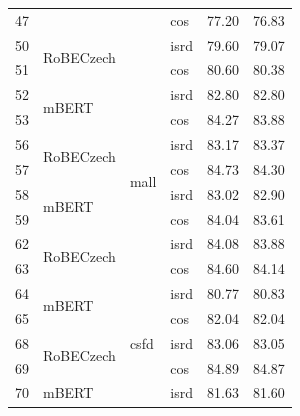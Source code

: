 \begin{table}[]
{\begin{tabular}{|l|l|l|l||ll|}
47 &                            &                           & cos                   & 77.20   & 76.83 \\ \cline{1-2} \cline{4-6}
50 & \multirow{2}{*}{RoBECzech} &                           & isrd                  & 79.60   & 79.07 \\ \cline{1-1} \cline{4-6}
51 &                            &                           & cos                   & 80.60   & 80.38 \\ \hline
52 & \multirow{2}{*}{mBERT}     & \multirow{8}{*}{mall}     & isrd                  & 82.80   & 82.80 \\ \cline{1-1} \cline{4-6}
53 &                            &                           & cos                   & 84.27   & 83.88 \\ \cline{1-2} \cline{4-6}
56 & \multirow{2}{*}{RoBECzech} &                           & isrd                  & 83.17   & 83.37 \\ \cline{1-1} \cline{4-6}
57 &                            &                           & cos                   & 84.73   & 84.30 \\ \cline{1-2} \cline{4-6}
58 & \multirow{2}{*}{mBERT}     &                           & isrd                  & 83.02   & 82.90 \\ \cline{1-1} \cline{4-6}
59 &                            &                           & cos                   & 84.04   & 83.61 \\ \cline{1-2} \cline{4-6}
62 & \multirow{2}{*}{RoBECzech} &                           & isrd                  & 84.08   & 83.88 \\ \cline{1-1} \cline{4-6}
63 &                            &                           & cos                   & 84.60   & 84.14 \\ \hline
64 & \multirow{2}{*}{mBERT}     & \multirow{8}{*}{csfd}     & isrd                  & 80.77   & 80.83 \\ \cline{1-1} \cline{4-6}
65 &                            &                           & cos                   & 82.04   & 82.04 \\ \cline{1-2} \cline{4-6}
68 & \multirow{2}{*}{RoBECzech} &                           & isrd                  & 83.06   & 83.05 \\ \cline{1-1} \cline{4-6}
69 &                            &                           & cos                   & 84.89   & 84.87 \\ \cline{1-2} \cline{4-6}
70 & \multirow{2}{*}{mBERT}     &                           & isrd                  & 81.63   & 81.60 \\ \cline{1-1} \cline{4-6}

\end{tabular}}
\end{table}
